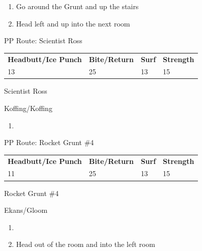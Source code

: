 \begin{paracol}{2}
\begin{enumerate}[resume]
	\item Go around the Grunt and up the stairs
	\item Head left and up into the next room
\end{enumerate}

\switchcolumn*
\begin{misc}{PP Route: Scientist Ross}
	\varwb
	\begin{tabu} to \textwidth {X[6,c] X[5,c] X[4,c] X[4,c]}
		\textbf{Headbutt/Ice Punch} & \textbf{Bite/Return} & \textbf{Surf} & \textbf{Strength}\\ 
		13 & 25 & 13 & 15
	\end{tabu}
	\varwe
\end{misc}

\switchcolumn
\begin{trainer}{Scientist Ross}
	\varwb
	\begin{fightSection}{Koffing/Koffing}
		\item {} \surf{} 
	\end{fightSection}
	\varwe
\end{trainer}

\begin{enumerate}[resume]
	\item {}
\end{enumerate}

\switchcolumn*
\begin{misc}{PP Route: Rocket Grunt \#4}
	\varwb
	\begin{tabu} to \textwidth {X[6,c] X[5,c] X[4,c] X[4,c]}
		\textbf{Headbutt/Ice Punch} & \textbf{Bite/Return} & \textbf{Surf} & \textbf{Strength}\\ 
		11 & 25 & 13 & 15
	\end{tabu}
	\varwe
\end{misc}

\switchcolumn
\begin{trainer}{Rocket Grunt \#4}
	\varwb
	\begin{fightSection}{Ekans/Gloom}
		\item {} \headbutt{} 
	\end{fightSection}
	\varwe
\end{trainer}

\begin{enumerate}[resume]
	\item {}
	\item Head out of the room and into the left room
\end{enumerate}


\end{paracol}

